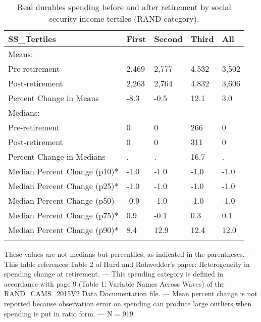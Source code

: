 \begin{table}[tbp] \centering
{}

\caption{Real durables spending before and after retirement by social security income tertiles (RAND category).}
\begin{tabularx}{\textwidth}{lCCCC}

\toprule
{SS\_Tertiles}&{First}&{Second}&{Third}&{All} \tabularnewline
\midrule\addlinespace[1.5ex]
Means:&&&& \tabularnewline
\midrule Pre-retirement&2,469&2,777&4,532&3,502 \tabularnewline
Post-retirement&2,263&2,764&4,832&3,606 \tabularnewline
Percent Change in Means&-8.3&-0.5&12.1&3.0 \tabularnewline
\midrule Medians:&&&& \tabularnewline
\midrule Pre-retirement&0&0&266&0 \tabularnewline
Post-retirement&0&0&311&0 \tabularnewline
Percent Change in Medians&.&.&16.7&. \tabularnewline
Median Percent Change (p10)*&-1.0&-1.0&-1.0&-1.0 \tabularnewline
Median Percent Change (p25)*&-1.0&-1.0&-1.0&-1.0 \tabularnewline
Median Percent Change (p50)&-0.9&-1.0&-1.0&-1.0 \tabularnewline
Median Percent Change (p75)*&0.9&-0.1&0.3&0.1 \tabularnewline
Median Percent Change (p90)*&8.4&12.9&12.4&12.0 \tabularnewline
\bottomrule \addlinespace[1.5ex]

\end{tabularx}
\begin{flushleft}
\footnotesize *These values are not medians but percentiles, as indicated in the parentheses. \linebreak --- \linebreak This table references Table 2 of Hurd and Rohwedder's paper: Heterogeneity in spending change at retirement. \linebreak --- \linebreak This spending category is defined in accordance with page 9 (Table 1: Variable Names Across Waves) of the RAND\_CAMS\_2015V2 Data Documentation file. \linebreak --- \linebreak Mean percent change is not reported because observation error on spending can produce large outliers when spending is put in ratio form. \linebreak --- \linebreak N = 919.
\end{flushleft}
\end{table}

